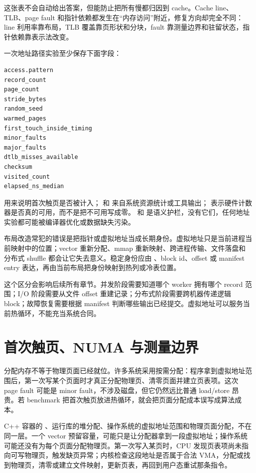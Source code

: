 这张表不会自动给出答案，但能防止把所有慢都归因到 cache。Cache line、TLB、page fault 和指针依赖都发生在“内存访问”附近，修复方向却完全不同：line 利用率靠布局，TLB 覆盖靠页形状和分块，fault 靠测量边界和驻留状态，指针依赖靠表示法改变。

一次地址路径实验至少保存下面字段：

\begin{lstlisting}[numbers=none,caption={地址路径审计报告字段}]
access.pattern
record_count
page_count
stride_bytes
random_seed
warmed_pages
first_touch_inside_timing
minor_faults
major_faults
dtlb_misses_available
checksum
visited_count
elapsed_ns_median
\end{lstlisting}

 用来说明首次触页是否被计入； 和  来自系统资源统计或工具输出； 表示硬件计数器是否真的可用，而不是把不可用写成零。 和  是语义护栏，没有它们，任何地址实验都可能被编译器优化或数据缺失污染。

布局改造常犯的错误是把指针或虚拟地址当成长期身份。虚拟地址只是当前进程当前映射中的位置；vector 重新分配、mmap 重新映射、跨进程传输、文件落盘和分布式 shuffle 都会让它失去意义。稳定身份应由 、block id、offset 或 manifest entry 表达，再由当前布局把身份映射到热列或冷表位置。

这个区分会影响后续所有章节。并发阶段需要知道哪个 worker 拥有哪个 record 范围；I/O 阶段需要从文件 offset 重建记录；分布式阶段需要跨机器传递逻辑 block；故障恢复需要根据 manifest 判断哪些输出已经提交。虚拟地址可以服务当前热循环，不能充当系统合同。

\section{首次触页、NUMA 与测量边界}

分配内存不等于物理页面已经就位。许多系统采用按需分配：程序拿到虚拟地址范围后，第一次写某个页面时才真正分配物理页、清零页面并建立页表项。这次 page fault 可能是 minor fault，不涉及磁盘，但它仍然远比普通 load/store 昂贵。若 benchmark 把首次触页放进热循环，就会把页面分配成本误写成算法成本。

C++ 容器的 、运行库的堆分配、操作系统的虚拟地址范围和物理页面分配，不在同一层。一个 vector 预留容量，可能只是让分配器拿到一段虚拟地址；操作系统可能还没有为每个页面分配物理页。第一次写入某页时，CPU 发现页表项尚未指向可写物理页，触发缺页异常；内核检查这段地址是否属于合法 VMA，分配或找到物理页，清零或建立文件映射，更新页表，再回到用户态重试那条指令。

